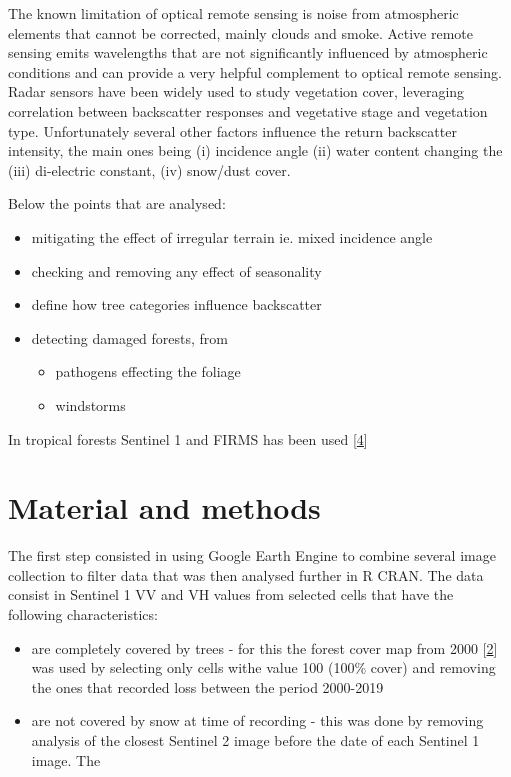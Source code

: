\documentclass[]{elsarticle} %
\providecommand{\tightlist}{%
  \setlength{\itemsep}{0pt}\setlength{\parskip}{0pt}}
\begin{document}
The known limitation of optical remote sensing is noise from atmospheric
elements that cannot be corrected, mainly clouds and smoke. Active
remote sensing emits wavelengths that are not significantly influenced
by atmospheric conditions and can provide a very helpful complement to
optical remote sensing. Radar sensors have been widely used to study
vegetation cover, leveraging correlation between backscatter responses
and vegetative stage and vegetation type. Unfortunately several other
factors influence the return backscatter intensity, the main ones being
(i) incidence angle (ii) water content changing the (iii) di-electric
constant, (iv) snow/dust cover.

Below the points that are analysed:

\begin{itemize}
\tightlist
\item
  mitigating the effect of irregular terrain ie. mixed incidence angle
\item
  checking and removing any effect of seasonality
\item
  define how tree categories influence backscatter
\item
  detecting damaged forests, from

  \begin{itemize}
  \tightlist
  \item
    pathogens effecting the foliage
  \item
    windstorms
  \end{itemize}
\end{itemize}

In tropical forests Sentinel 1 and FIRMS has been used
{[}\protect\hyperlink{ref-Reiche2018}{4}{]}

\hypertarget{material-and-methods}{%
\section{Material and methods}\label{material-and-methods}}

The first step consisted in using Google Earth Engine to combine several
image collection to filter data that was then analysed further in R
CRAN. The data consist in Sentinel 1 VV and VH values from selected
cells that have the following characteristics:

\begin{itemize}
\item
  are completely covered by trees - for this the forest cover map from
  2000 {[}\protect\hyperlink{ref-Hansen2013}{2}{]} was used by selecting
  only cells withe value 100 (100\% cover) and removing the ones that
  recorded loss between the period 2000-2019
\item
  are not covered by snow at time of recording - this was done by
  removing analysis of the closest Sentinel 2 image before the date of
  each Sentinel 1 image. The
\end{itemize}
\end{document}
